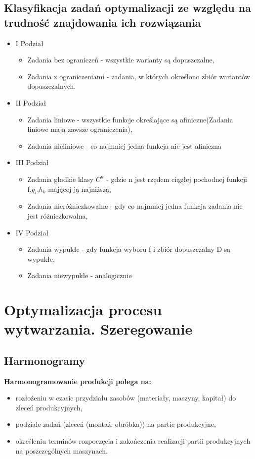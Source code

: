 \documentclass[10pt, a
4paper]{article}
\begin{document}
\subsection{Klasyfikacja zadań optymalizacji ze względu na trudność znajdowania ich rozwiązania}
\begin{itemize}
\item I Podział
\begin{itemize}
\item Zadania bez ograniczeń - wszystkie warianty są dopuszczalne,
\item Zadania z ograniczeniami - zadania, w których określono zbiór wariantów dopuszczalnych.
\end{itemize}
\item II Podział
\begin{itemize}
\item Zadania liniowe - wszystkie funkcje określające są afiniczne(Zadania liniowe mają zawsze ograniczenia),
\item Zadania nieliniowe - co najmniej jedna funkcja nie jest afiniczna
\end{itemize}
\item III Podział
\begin{itemize}
\item Zadania gładkie klasy $C^n$ - gdzie n jest rzędem ciągłej pochodnej funkcji f,$g_{i}$,$h_{k}$ mającej ją najniższą,
\item Zadania nieróżniczkowalne - gdy co najmniej jedna funkcja zadania nie jest różniczkowalna,
\end{itemize}
\item IV Podział
\begin{itemize}
\item Zadania wypukłe - gdy funkcja wyboru f i zbiór dopuszczalny D są wypukłe,
\item Zadania niewypukłe - analogicznie
\end{itemize}
\end{itemize}





\newpage
\section{Optymalizacja procesu wytwarzania. Szeregowanie}
\subsection{Harmonogramy}
\noindent \textbf{Harmonogramowanie produkcji polega na:}
\begin{itemize}
\item rozłożeniu w czasie przydziału zasobów (materiały, maszyny, kapitał) do zleceń produkcyjnych,
\item podziale zadań (zleceń (montaż, obróbka)) na partie produkcyjne,
\item określeniu terminów rozpoczęcia i zakończenia realizacji partii produkcyjnych na poszczególnych maszynach.
\end{itemize}
\end{document}
